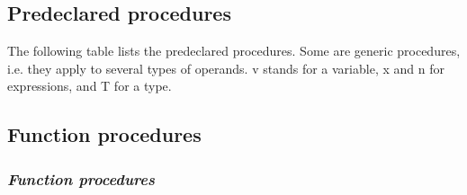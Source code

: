 \subsection{Predeclared procedures}\label{o2r:predecl:proc}

The following table lists the predeclared procedures. Some are generic
procedures, i.e. they apply to several types of operands. v stands
for a variable, x and n for expressions, and T for a type.

\ifonline
\subsection{Function procedures}
\else
\subsubsection{\em Function procedures}
\fi
\label{o2r:std:func}

